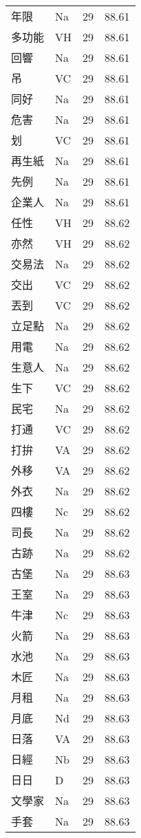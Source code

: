 \documentclass[twocolumn]{book}
\begin{document}
\begin{supertabular}{llrr}
年限 & Na & 29 &  88.61\\
多功能 & VH & 29 &  88.61\\
回響 & Na & 29 &  88.61\\
吊 & VC & 29 &  88.61\\
同好 & Na & 29 &  88.61\\
危害 & Na & 29 &  88.61\\
划 & VC & 29 &  88.61\\
再生紙 & Na & 29 &  88.61\\
先例 & Na & 29 &  88.61\\
企業人 & Na & 29 &  88.61\\
任性 & VH & 29 &  88.62\\
亦然 & VH & 29 &  88.62\\
交易法 & Na & 29 &  88.62\\
交出 & VC & 29 &  88.62\\
丟到 & VC & 29 &  88.62\\
立足點 & Na & 29 &  88.62\\
用電 & Na & 29 &  88.62\\
生意人 & Na & 29 &  88.62\\
生下 & VC & 29 &  88.62\\
民宅 & Na & 29 &  88.62\\
打通 & VC & 29 &  88.62\\
打拚 & VA & 29 &  88.62\\
外移 & VA & 29 &  88.62\\
外衣 & Na & 29 &  88.62\\
四樓 & Nc & 29 &  88.62\\
司長 & Na & 29 &  88.62\\
古跡 & Na & 29 &  88.62\\
古堡 & Na & 29 &  88.63\\
王室 & Na & 29 &  88.63\\
牛津 & Nc & 29 &  88.63\\
火箭 & Na & 29 &  88.63\\
水池 & Na & 29 &  88.63\\
木匠 & Na & 29 &  88.63\\
月租 & Na & 29 &  88.63\\
月底 & Nd & 29 &  88.63\\
日落 & VA & 29 &  88.63\\
日經 & Nb & 29 &  88.63\\
日日 & D & 29 &  88.63\\
文學家 & Na & 29 &  88.63\\
手套 & Na & 29 &  88.63\\

\end{supertabular}
\end{document}
